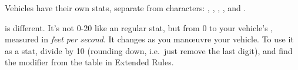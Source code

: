 
Vehicles have their own stats, separate from characters: , , , ,  and .

 is different. It's not 0-20 like an regular stat, but from 0 to your vehicle's , measured in \emph{feet per second}. It changes as you man\oe{}uvre your vehicle. To use it as a stat, divide by 10 (rounding down, i.e.\ just remove the last digit), and find the modifier from the table in Extended Rules.
